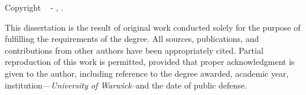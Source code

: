 
\vspace*{\fill}

{%
    \noindent \textbf{\GetTitle}
    
    \noindent Copyright \textcopyright~\the\year{} - \GetFirstAuthor, \GetSchool.
    
    \vspace{.575em}

    \noindent This dissertation is the result of original work conducted solely for the purpose of fulfilling the requirements of the degree. All sources, publications, and contributions from other authors have been appropriately cited. Partial reproduction of this work is permitted, provided that proper acknowledgment is given to the author, including reference to the degree awarded, academic year, institution---\textit{University of Warwick}--and the date of public defense.

    \vspace{2.4em}
    
    \noindent{}
    

}

\vspace*{\fill}
